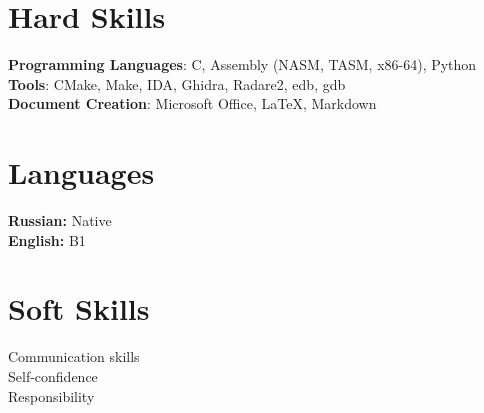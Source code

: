 \documentclass[A4,11pt]{article}
\begin{document}
\section{Hard Skills}
 \begin{itemize}[leftmargin=0.5cm, label={}]
    \small{\item{
     \textbf{Programming Languages}{: C, Assembly (NASM, TASM, x86-64), Python} \\
     \textbf{Tools}{: CMake, Make, IDA, Ghidra, Radare2, edb, gdb} \\
     \textbf{Document Creation}{: Microsoft Office, LaTeX, Markdown}
    }}
 \end{itemize}
    

\section{Languages}
 \begin{itemize}[leftmargin=0.5cm, label={}]
    \small{\item{
\textbf{Russian:} Native \\
\textbf{English:} B1
    }}
 \end{itemize}
    

\section{Soft Skills}
 \begin{itemize}[leftmargin=0.5cm, label={}]
    \small{\item{
     {Communication skills}\\
     {Self-confidence}\\
     {Responsibility}
    }}
 \end{itemize}
    
\end{document}
